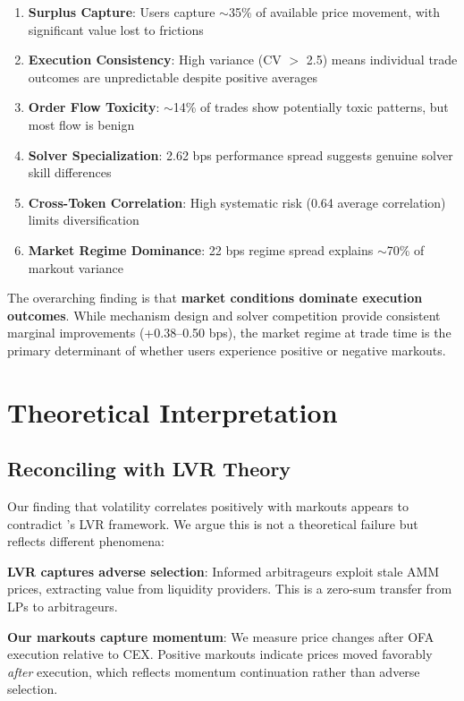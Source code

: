 \documentclass[12pt,a4paper]{article}
\begin{document}
\begin{enumerate}
    \item \textbf{Surplus Capture}: Users capture $\sim$35\% of available price movement, with significant value lost to frictions
    \item \textbf{Execution Consistency}: High variance (CV $>$ 2.5) means individual trade outcomes are unpredictable despite positive averages
    \item \textbf{Order Flow Toxicity}: $\sim$14\% of trades show potentially toxic patterns, but most flow is benign
    \item \textbf{Solver Specialization}: 2.62 bps performance spread suggests genuine solver skill differences
    \item \textbf{Cross-Token Correlation}: High systematic risk (0.64 average correlation) limits diversification
    \item \textbf{Market Regime Dominance}: 22 bps regime spread explains $\sim$70\% of markout variance
\end{enumerate}

The overarching finding is that \textbf{market conditions dominate execution outcomes}. While mechanism design and solver competition provide consistent marginal improvements (+0.38--0.50 bps), the market regime at trade time is the primary determinant of whether users experience positive or negative markouts.

\section{Theoretical Interpretation}

\subsection{Reconciling with LVR Theory}

Our finding that volatility correlates positively with markouts appears to contradict \cite{milionis2022}'s LVR framework. We argue this is not a theoretical failure but reflects different phenomena:

\textbf{LVR captures adverse selection}: Informed arbitrageurs exploit stale AMM prices, extracting value from liquidity providers. This is a zero-sum transfer from LPs to arbitrageurs.

\textbf{Our markouts capture momentum}: We measure price changes after OFA execution relative to CEX. Positive markouts indicate prices moved favorably \textit{after} execution, which reflects momentum continuation rather than adverse selection.
\end{document}
